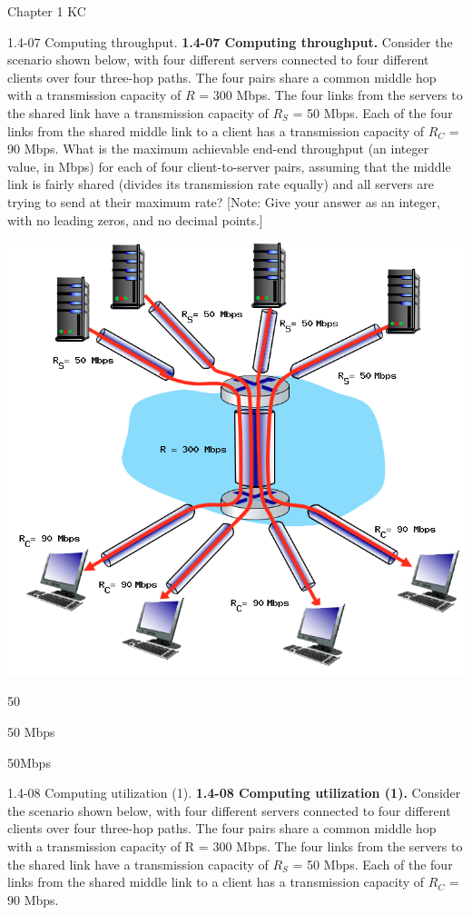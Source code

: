 \documentclass[a4paper]{article}
\begin{document}
\begin{quiz}{Chapter 1 KC}
\begin{shortanswer}[points=1,shuffle=true]{1.4-07 Computing throughput.}
\textbf{1.4-07 Computing throughput.} 
Consider the scenario shown below, with four different servers connected to four different clients over four three-hop paths. The four pairs share a common middle hop with a transmission capacity of $R$ = 300 Mbps. The four links from the servers to the shared link have a transmission capacity of $R_S$ = 50 Mbps. Each of the four links from the shared middle link to a client has a transmission capacity of $R_C$ = 90 Mbps. What is the maximum achievable end-end throughput (an integer value, in Mbps) for each of four client-to-server pairs, assuming that the middle link is fairly shared (divides its transmission rate equally) and all servers are trying to send at their maximum rate? 
[Note: Give your answer as an integer, with no leading zeros, and no decimal points.] 
\begin{center}
\includegraphics[width=.7\linewidth]{figs/1.4.7.png}
\end{center}
\item 50
\item 50 Mbps
\item 50Mbps
\end{shortanswer}

\begin{shortanswer}[points=1,shuffle=true]{1.4-08 Computing utilization (1).}
\textbf{1.4-08 Computing utilization (1).} 
Consider the scenario shown below, with four different servers connected to four different clients over four three-hop paths. The four pairs share a common middle hop with a transmission capacity of R = 300 Mbps. The four links from the servers to the shared link have a transmission capacity of $R_S$ = 50 Mbps. Each of the four links from the shared middle link to a client has a transmission capacity of $R_C$ = 90 Mbps. 


\end{shortanswer}
\end{quiz}
\end{document}

